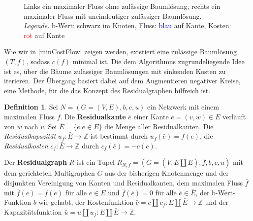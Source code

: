 \documentclass[a4paper,twoside,ngerman]{report}
\theoremstyle{plain}
\theoremstyle{definition}
\newtheorem{defn}[thm]{Definition}
\begin{document}
\begin{figure}[!h]\centering
{}
\caption{Links ein maximaler Fluss ohne zulässige Baumlösung, rechts ein maximaler Fluss mit uneindeutiger zulässiger Baumlösung.\protect\\
\protect\textit{Legende.} b-Wert: schwarz im Knoten, Fluss: \protect\textcolor{blue}{blau} auf Kante, Kosten: \protect\textcolor{red}{rot} auf Kante}
\label{fig:augm}
\end{figure}

Wie wir in \cref{minCostFlow} zeigen werden, existiert eine zulässige Baumlösung $(T,f)$, sodass $c(f)$ minimal ist. Die dem Algorithmus zugrundeliegende Idee ist es, über die Bäume zulässiger Baumlösungen mit sinkenden Kosten zu iterieren. Der Übergang basiert dabei auf dem Augmentieren negativer Kreise, eine Methode, für die das Konzept des Residualgraphen hilfreich ist.

\begin{defn}\label{defRes}Sei $N=(G=(V,E),b,c,u)$ ein Netzwerk mit einem maximalen Fluss $f$. Die \textbf{Residualkante} $\bar{e}$ einer Kante $e=(v,w)\in E$ verläuft von $w$ nach $v$. Sei $\bar{E}=\{\bar{e}|e\in E\}$ die Menge aller Residualkanten. Die \textit{Residualkapazität} $u_f:\bar{E}\rightarrow\mathbb{Z}$ ist bestimmt durch $u_f(\bar{e})=f(e)$, die \textit{Residualkosten} $c_f:\bar{E}\rightarrow\mathbb{Z}$ durch $c_f(\bar{e})=-c(e)$.

Der \textbf{Residualgraph} $R$ ist ein Tupel $R_{N,f}=(\bar{G}=(V,E\amalg\bar{E}),\bar{f},b,\bar{c},\bar{u})$ mit dem gerichteten Multigraphen $\bar{G}$ aus der bisherigen Knotenmenge und der disjunkten Vereinigung von Kanten und Residualkanten, dem maximalen Fluss $\bar{f}$ mit $\bar{f}(e)=f(e)$ für alle $e\in E$ und $\bar{f}(\bar{e})=0$ für alle $\bar{e}\in\bar{E}$, der b-Wert-Funktion $b$ wie gehabt, der Kostenfunktion $\bar{c}=c\amalg c_f:E\amalg\bar{E}\rightarrow\mathbb{Z}$ und der Kapazitätsfunktion $\bar{u}=u\amalg u_f:E\amalg\bar{E}\rightarrow\mathbb{Z}$. 
\end{defn}
\end{document}
